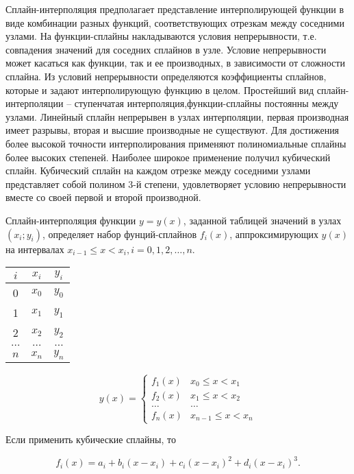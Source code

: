 \documentclass[10pt]{article}
\begin{document}
Сплайн-интерполяция предполагает представление интерполирующей функции в виде комбинации разных функций, соответствующих отрезкам между соседними узлами.
На функции-сплайны накладываются условия непрерывности, т.е. совпадения значений для соседних сплайнов в узле.
Условие непрерывности может касаться как функции, так и ее производных, в зависимости от сложности сплайна.
Из условий непрерывности определяются коэффициенты сплайнов, которые и задают интерполирующую функцию в целом.
Простейший вид сплайн-интерполяции – ступенчатая интерполяция,функции-сплайны постоянны между узлами.
Линейный сплайн непрерывен в узлах интерполяции, первая производная имеет разрывы, вторая и высшие производные не существуют.
Для достижения более высокой точности интерполирования применяют полиномиальные сплайны более высоких степеней.
Наиболее широкое применение получил кубический сплайн.
Кубический сплайн на каждом отрезке между соседними узлами представляет собой полином 3-й степени, удовлетворяет условию непрерывности вместе со своей первой и второй производной.

Сплайн-интерполяция функции $y=y(x)$, заданной таблицей значений в узлах $\left(x_{i} ; y_{i}\right)$, определяет набор фунций-сплайнов $f_{i}(x)$, аппроксимирующих $y(x)$ на интервалах $x_{i-1} \leq x<x_{i}, i=0,1,2, \ldots, n$.

\begin{center}
\begin{tabular}{|c|c|c|}
\hline
$i$ & $x_{i}$ & $y_{i}$ \\
\hline
0 & $x_{0}$ & $y_{0}$ \\
\hline
1 & $x_{1}$ & $y_{1}$ \\
\hline
2 & $x_{2}$ & $y_{2}$ \\
\hline
$\ldots$ & $\ldots$ & $\ldots$ \\
\hline
$n$ & $x_{n}$ & $y_{n}$ \\
\hline
\end{tabular}
\end{center}

$$
y(x)=\left\{\begin{array}{cc}
f_{1}(x) & x_{0} \leq x<x_{1} \\
f_{2}(x) & x_{1} \leq x<x_{2} \\
\ldots & \ldots \\
f_{n}(x) & x_{n-1} \leq x<x_{n}
\end{array}\right.
$$

Если применить кубические сплайны, то


\begin{equation*}
f_{i}(x)=a_{i}+b_{i}\left(x-x_{i}\right)+c_{i}\left(x-x_{i}\right)^{2}+d_{i}\left(x-x_{i}\right)^{3} . \tag{5.4}
\end{equation*}
\end{document}
